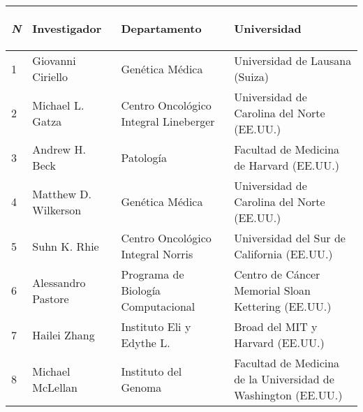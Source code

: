 \begin{table*}[!htb]
	\footnotesize
	\centering
	\begin{threeparttable}
		\begin{tabular}{p{0.5cm} p{3.5cm} p{4cm} p{5.5cm}} \toprule
			\begin{center}\textit{N}\end{center}   
			&\begin{center}Investigador\end{center}       
			&\begin{center}Departamento\end{center}
			&\begin{center}Universidad\end{center}  
			\\ \hline
			1
			& Giovanni Ciriello
			& Genética Médica
			& Universidad de Lausana (Suiza)
			\\ \hline
			2
			& Michael L. Gatza
			& Centro Oncológico Integral Lineberger
			& Universidad de Carolina del Norte (EE.UU.)
			\\ \hline
			3
			& Andrew H. Beck
			& Patología
			& Facultad de Medicina de Harvard (EE.UU.)
			\\ \hline
			4
			& Matthew D. Wilkerson
			& Genética Médica
			& Universidad de Carolina del Norte (EE.UU.)
			\\ \hline
			5
			& Suhn K. Rhie
			& Centro Oncológico Integral Norris
			& Universidad del Sur de California (EE.UU.)
			\\ \hline
			6
			& Alessandro Pastore
			& Programa de Biología Computacional
			& Centro de Cáncer Memorial Sloan Kettering (EE.UU.)
			\\ \hline
			7
			& Hailei Zhang
			& Instituto Eli y Edythe L.
			& Broad del MIT y Harvard (EE.UU.)
			\\ \hline
			8
			& Michael McLellan
			& Instituto del Genoma
			& Facultad de Medicina de la Universidad de Washington (EE.UU.)					
			\\ \hline

\end{tabular}
\end{threeparttable}
\end{table*}
